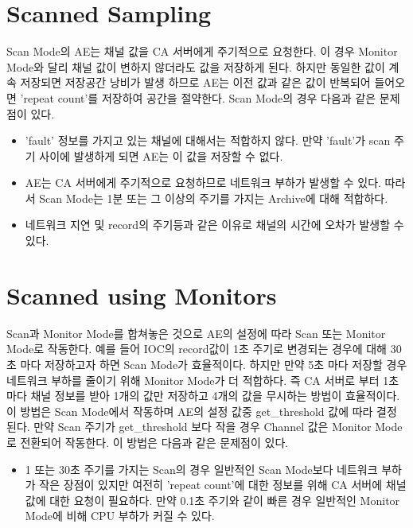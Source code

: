 \documentclass[11pt
  , a4paper
  , article
  , oneside
]{memoir}
\begin{document}
\section{Scanned Sampling}
Scan Mode의 AE는 채널 값을 CA 서버에게 주기적으로 요청한다. 이 경우 Monitor Mode와 달리
채널 값이 변하지 않더라도 값을 저장하게 된다. 하지만 동일한 값이 계속 저장되면 저장공간 낭비가
발생 하므로 AE는 이전 값과 같은 값이 반복되어 들어오면 'repeat count'를 저장하여 공간을 절약한다.
Scan Mode의 경우 다음과 같은 문제점이 있다.
\begin{itemize}
\item 'fault' 정보를 가지고 있는 채널에 대해서는 적합하지 않다. 만약 'fault'가 scan 주기 사이에
발생하게 되면 AE는 이 값을 저장할 수 없다.
\item AE는 CA 서버에게 주기적으로 요청하므로 네트워크 부하가 발생할 수 있다. 따라서 Scan Mode는
1분 또는 그 이상의 주기를 가지는 Archive에 대해 적합하다.
\item 네트워크 지연 및 record의 주기등과 같은 이유로 채널의 시간에 오차가 발생할 수 있다.
\end{itemize} 
\section{Scanned using Monitors}
Scan과 Monitor Mode를 합쳐놓은 것으로 AE의 설정에 따라 Scan 또는 Monitor Mode로 작동한다.
예를 들어 IOC의 record값이 1초 주기로 변경되는 경우에 대해 30초 마다 저장하고자 하면
Scan Mode가 효율적이다. 하지만 만약 5초 마다 저장할 경우 네트워크 부하를 줄이기 위해
Monitor Mode가 더 적합하다. 즉 CA 서버로 부터 1초마다 채널 정보를 받아 1개의 값만 저장하고
4개의 값을 무시하는 방법이 효율적이다.
이 방법은 Scan Mode에서 작동하며 AE의 설정 값중 get\_threshold 값에 따라 결정 된다.
만약 Scan 주기가 get\_threshold 보다 작을 경우 Channel 값은 Monitor Mode로 전환되어 작동한다.
이 방법은 다음과 같은 문제점이 있다.
\begin{itemize}
\item 1 또는 30초 주기를 가지는 Scan의 경우 일반적인 Scan Mode보다 네트워크 부하가 작은 장점이
있지만 여전히 'repeat count'에 대한 정보를 위해 CA 서버에 채널값에 대한 요청이 필요하다. 만약
0.1초 주기와 같이 빠른 경우 일반적인 Monitor Mode에 비해 CPU 부하가 커질 수 있다.
\end{itemize}
\end{document}
